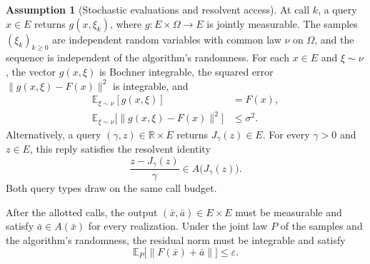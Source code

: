\documentclass[10pt]{article}
\theoremstyle{definition}
\newtheorem{assumption}{Assumption}
\begin{document}
\begin{assumption}[Stochastic evaluations and resolvent access]
At call $k$, a query $x\in E$ returns $g(x,\xi_k)$, where $g:E\times\Omega\to E$ is jointly measurable. The samples $(\xi_k)_{k\geq0}$ are independent random variables with common law $\nu$ on $\Omega$, and the sequence is independent of the algorithm's randomness. For each $x\in E$ and $\xi\sim\nu$, the vector $g(x,\xi)$ is Bochner integrable, the squared error $\|g(x,\xi)-F(x)\|^2$ is integrable, and
\[
\begin{aligned}
\mathbb{E}_{\xi\sim\nu}[g(x,\xi)] &= F(x),\\
\mathbb{E}_{\xi\sim\nu}\bigl[\|g(x,\xi)-F(x)\|^2\bigr] &\leq \sigma^2.
\end{aligned}
\]
Alternatively, a query $(\gamma,z)\in\mathbb{R}\times E$ returns $J_\gamma(z)\in E$. For every $\gamma>0$ and $z\in E$, this reply satisfies the resolvent identity
\[
\frac{z-J_\gamma(z)}{\gamma}\in A\bigl(J_\gamma(z)\bigr).
\]
Both query types draw on the same call budget.
\end{assumption}

After the allotted calls, the output $(\bar{x},\bar{a})\in E\times E$ must be measurable and satisfy $\bar{a}\in A(\bar{x})$ for every realization. Under the joint law $P$ of the samples and the algorithm's randomness, the residual norm must be integrable and satisfy
\[
\mathbb{E}_{P}\bigl[\|F(\bar{x})+\bar{a}\|\bigr]\leq\varepsilon.
\]
\end{document}
